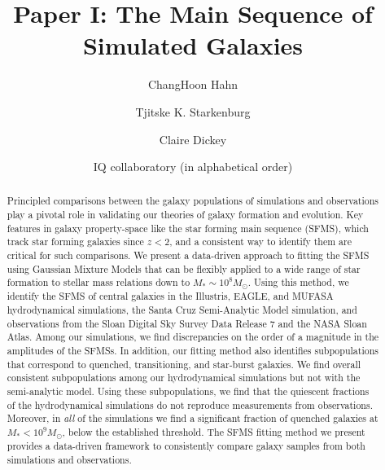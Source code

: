 \documentclass[preprint2,tighten]{aastex62}
\begin{document}
\title{Paper I: The Main Sequence of Simulated Galaxies}
\author{ChangHoon Hahn}
\author{Tjitske K. Starkenburg}
\author{Claire Dickey}

\author{IQ collaboratory (in alphabetical order)}

\begin{abstract}
Principled comparisons between the galaxy populations of simulations and 
observations play a pivotal role in validating our theories of galaxy 
formation and evolution. %
Key features in galaxy property-space like the star forming main sequence
(SFMS), which track %
star forming galaxies since $z<2$,
and a consistent  way to identify them are critical for such comparisons. 
We present a data-driven approach to fitting the SFMS using Gaussian 
Mixture Models that can be flexibly applied to a wide range of star 
formation to stellar mass relations down to $M_*{\sim}10^{8}M_\odot$. %
Using this method, we identify the SFMS of central galaxies in 
the Illustris, EAGLE, and MUFASA hydrodynamical simulations, the Santa Cruz 
Semi-Analytic Model simulation, and observations from the Sloan Digital 
Sky Survey Data Release 7 and the NASA Sloan Atlas. Among our simulations, 
we find discrepancies on the order of a magnitude in the amplitudes of the 
SFMSs. In addition, our fitting method also identifies subpopulations 
that correspond to quenched, transitioning, and star-burst galaxies. We 
find overall consistent subpopulations among our hydrodynamical 
simulations but not with the semi-analytic model. Using these subpopulations, 
we find that the quiescent fractions of the hydrodynamical simulations do 
not reproduce measurements from observations. Moreover, in \emph{all} of the 
simulations we find a significant fraction of quenched galaxies at 
$M_* < 10^9M_\odot$, below the established \cite{geha2012} threshold. The 
SFMS fitting method we present provides a data-driven framework to 
consistently compare galaxy samples from both simulations and observations. 
\end{abstract}
\end{document}
